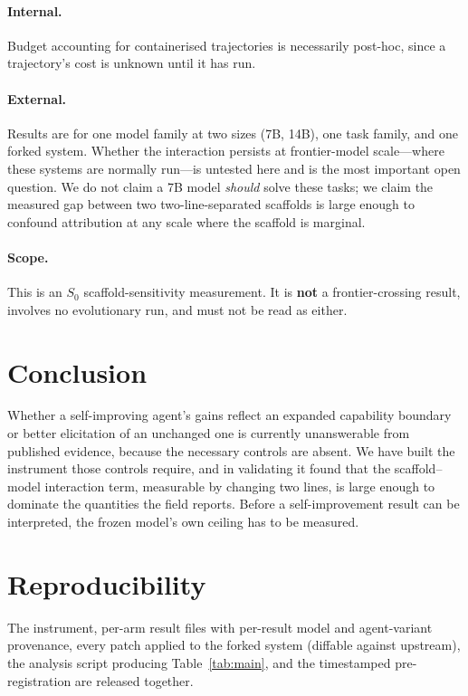 \documentclass{article}
\newcommand{\Sz}{\ensuremath{S_0}}
\begin{document}
\paragraph{Internal.} Budget accounting for containerised trajectories is
necessarily post-hoc, since a trajectory's cost is unknown until it has run.

\paragraph{External.} Results are for one model family at
two sizes (7B, 14B), one task family, and one forked system. Whether
the interaction persists at frontier-model scale---where these systems are
normally run---is untested here and is the most important open question. We do
not claim a 7B model \emph{should} solve these tasks; we claim the measured
gap between two two-line-separated scaffolds is large enough to confound
attribution at any scale where the scaffold is marginal.

\paragraph{Scope.} This is an \Sz{} scaffold-sensitivity measurement. It is
\textbf{not} a frontier-crossing result, involves no evolutionary run, and must
not be read as either.

\section{Conclusion}

Whether a self-improving agent's gains reflect an expanded capability boundary
or better elicitation of an unchanged one is currently unanswerable from
published evidence, because the necessary controls are absent. We have built
the instrument those controls require, and in validating it found that the
scaffold--model interaction term, measurable by changing two lines, is large
enough to dominate the quantities the field reports. Before a self-improvement
result can be interpreted, the frozen model's own ceiling has to be measured.

\section*{Reproducibility}

The instrument, per-arm result files with per-result model and agent-variant
provenance, every patch applied to the forked system (diffable against
upstream), the analysis script producing Table~\ref{tab:main}, and the
timestamped pre-registration are released together.
\end{document}
